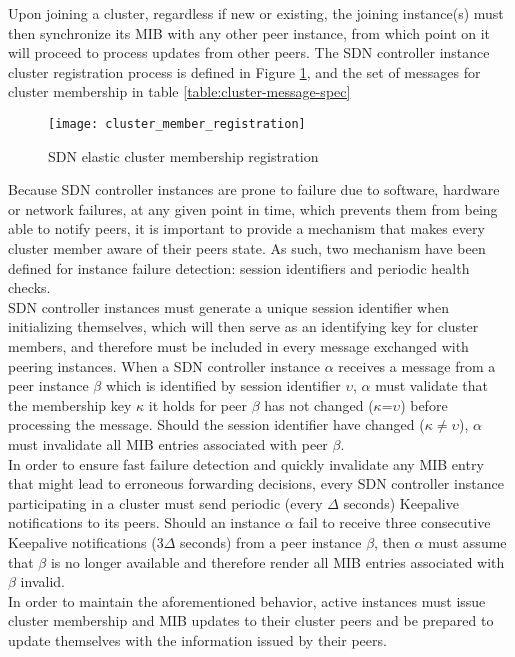 Upon joining a cluster, regardless if new or existing, the joining instance(s) must then synchronize its \gls{MIB} with any other peer instance, from which point on it will proceed to process updates from other peers.
The \gls{SDN} controller instance cluster registration process is defined in Figure \ref{fig:cluster_registration_process}, and the set of messages for cluster membership in table \ref{table:cluster-message-spec}\\
%
\begin{figure}
	\centering
	\texttt{[image: cluster\_member\_registration]}
	\caption{SDN elastic cluster membership registration}
	\label{fig:cluster_registration_process}
\end{figure}
%
Because \gls{SDN} controller instances are prone to failure due to software, hardware or network failures, at any given point in time, which prevents them from being able to notify peers, it is important to provide a mechanism that makes every cluster member aware of their peers state.
As such, two mechanism have been defined for instance failure detection: session identifiers and periodic health checks.\\
\gls{SDN} controller instances must generate a unique session identifier when initializing themselves, which will then serve as an identifying key for cluster members, and therefore must be included in every message exchanged with peering instances.
When a \gls{SDN} controller instance $\alpha$ receives a message from a peer instance $\beta$ which is identified by session identifier $\upsilon$, $\alpha$ must validate that the membership key $\kappa$ it holds for peer $\beta$ has not changed ($\kappa$=$\upsilon$) before processing the message.
Should the session identifier have changed ($\kappa$$\neq$$\upsilon$), $\alpha$ must invalidate all \gls{MIB} entries associated with peer $\beta$.\\
In order to ensure fast failure detection and quickly invalidate any \gls{MIB} entry that might lead to erroneous forwarding decisions, every \gls{SDN} controller instance participating in a cluster must send periodic (every $\Delta$ seconds) \gls{Keepalive} notifications to its peers.
Should an instance $\alpha$ fail to receive three consecutive \gls{Keepalive} notifications (3$\Delta$ seconds) from a peer instance $\beta$, then $\alpha$ must assume that $\beta$ is no longer available and therefore render all \gls{MIB} entries associated with $\beta$ invalid.\\
%
In order to maintain the aforementioned behavior, active instances must issue cluster membership and \gls{MIB} updates to their cluster peers and be prepared to update themselves with the information issued by their peers.
